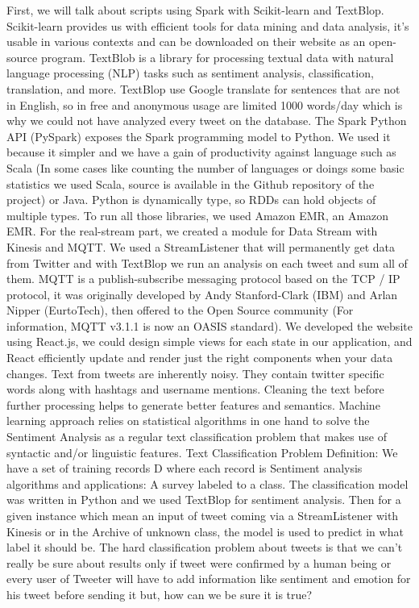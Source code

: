 \documentclass{acmtog} %
\begin{document}
First, we will talk about scripts using Spark with Scikit-learn and TextBlop. Scikit-learn provides us with efficient tools for data mining and data analysis, it’s usable in various contexts and can be downloaded on their website as an open-source program. TextBlob is a library for processing textual data with natural language processing (NLP) tasks such as sentiment analysis, classification, translation, and more. TextBlop use Google translate for sentences that are not in English, so in free and anonymous usage are limited 1000 words/day which is why we could not have analyzed every tweet on the database. The Spark Python API (PySpark) exposes the Spark programming model to Python. We used it because it simpler and we have a gain of productivity against language such as Scala (In some cases like counting the number of languages or doings some basic statistics we used Scala, source is available in the Github repository of the project) or Java. Python is dynamically type, so RDDs can hold objects of multiple types. To run all those libraries, we used Amazon EMR, an Amazon EMR. For the real-stream part, we created a module for Data Stream with Kinesis and MQTT. We used a StreamListener that will permanently get data from Twitter and with TextBlop we run an analysis on each tweet and sum all of them.
MQTT is a publish-subscribe messaging protocol based on the TCP / IP protocol, it was originally developed by Andy Stanford-Clark (IBM) and Arlan Nipper (EurtoTech), then offered to the Open Source community (For information, MQTT v3.1.1 is now an OASIS standard). We developed the website using React.js, we could design simple views for each state in our application, and React efficiently update and render just the right components when your data changes. Text from tweets are inherently noisy. They contain twitter specific words along with hashtags and username mentions. Cleaning the text before further processing helps to generate better features and semantics.
Machine learning approach relies on statistical algorithms in one hand to solve the Sentiment Analysis as a regular text classification problem that makes use of syntactic and/or linguistic features. Text Classification Problem Definition: We have a set of training records D where each record is Sentiment analysis algorithms and applications: A survey labeled to a class. The classification model was written in Python and we used TextBlop for sentiment analysis. Then for a given instance which mean an input of tweet coming via a StreamListener with Kinesis or in the Archive of unknown class, the model is used to predict in what label it should be. The hard classification problem about tweets is that we can’t really be sure about results only if tweet were confirmed by a human being or every user of Tweeter will have to add information like sentiment and emotion for his tweet before sending it but, how can we be sure it is true?
\end{document}
